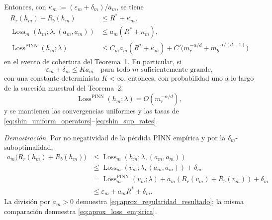 Entonces, con $\kappa_m:=(\varepsilon_m+\delta_m)/a_m$, se tiene
\begin{align}
R_r(h_m)+R_b(h_m)&\leq R^*+\kappa_m,
\label{eq:aprox_regularidad_resultado}\\
\operatorname{Loss}_m(h_m;\lambda,(a_m,a_m))
 &\leq a_m(R^*+\kappa_m),
\label{eq:aprox_loss_empirica}\\
\operatorname{Loss}^{\mathrm{PINN}}(h_m;\lambda)
 &\leq C_ma_m(R^*+\kappa_m)
 +C'\bigl(m_r^{-\alpha/d}+m_b^{-\alpha/(d-1)}\bigr)
\label{eq:aprox_loss_poblacional}
\end{align}
en el evento de cobertura del Teorema~1. En particular, si
\begin{equation}\label{eq:aprox_escala_suficiente}
\boxed{\qquad\varepsilon_m+\delta_m\leq K a_m
\quad\text{para todo $m$ suficientemente grande,}\qquad}
\end{equation}
con una constante determinista $K<\infty$, entonces, con probabilidad
uno a lo largo de la sucesión muestral del Teorema~2,
\begin{equation}\label{eq:aprox_tasa_poblacional}
\operatorname{Loss}^{\mathrm{PINN}}(h_m;\lambda)
=O(m_r^{-\alpha/d}),
\end{equation}
y se mantienen las convergencias uniformes y las tasas de
\eqref{eq:shin_uniform_operators}--\eqref{eq:shin_sup_rates}.

\medskip
\noindent\textit{Demostración.}
Por no negatividad de la pérdida PINN empírica y por la
$\delta_m$-suboptimalidad,
\begin{align*}
a_m\bigl(R_r(h_m)+R_b(h_m)\bigr)
&\leq\operatorname{Loss}_m(h_m;\lambda,(a_m,a_m))\\
&\leq\operatorname{Loss}_m(v_m;\lambda,(a_m,a_m))+\delta_m\\
&=\operatorname{Loss}^{\mathrm{PINN}}_m(v_m;\lambda)
   +a_m(R_r(v_m)+R_b(v_m))+\delta_m\\
&\leq \varepsilon_m+a_mR^*+\delta_m.
\end{align*}
La división por $a_m>0$ demuestra
\eqref{eq:aprox_regularidad_resultado}; la misma comparación demuestra
\eqref{eq:aprox_loss_empirica}.

